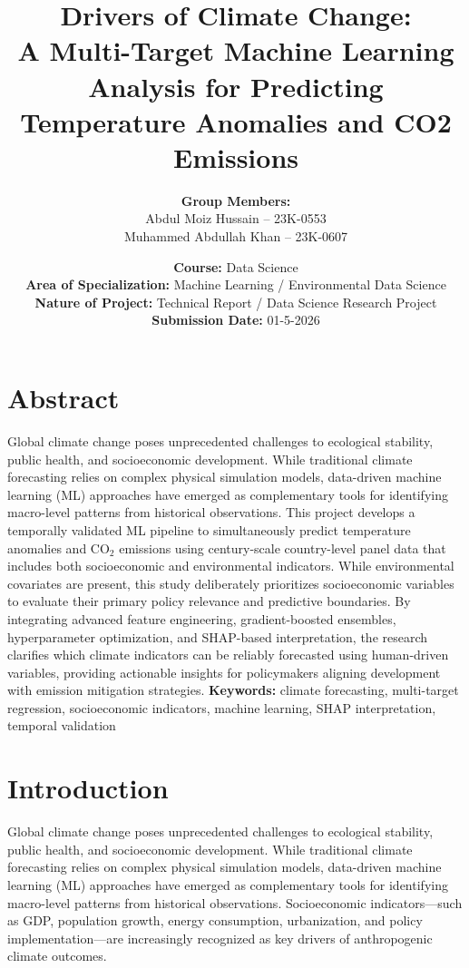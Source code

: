 \documentclass[12pt, a4paper]{article}
\title{
    \vspace{-2cm}
    \textbf{\Socioeconomic Drivers of Climate Change: \\ A Multi-Target Machine Learning Analysis for Predicting Temperature Anomalies and CO2 Emissions }
    \vspace{0.5cm}
}
\author{
    \textbf{Group Members:}\\[0.3cm]
    Abdul Moiz Hussain -- 23K-0553\\
    Muhammed Abdullah Khan -- 23K-0607
}
\date{
    \textbf{Course:} Data Science\\
    \textbf{Area of Specialization:} Machine Learning / Environmental Data Science\\
    \textbf{Nature of Project:} Technical Report / Data Science Research Project\\
    \textbf{Submission Date:} 01-5-2026
}
\begin{document}
\maketitle
\thispagestyle{empty}
\newpage
\tableofcontents

\section*{Abstract}
Global climate change poses unprecedented challenges to ecological stability, public health, and socioeconomic development. While traditional climate forecasting relies on complex physical simulation models, data-driven machine learning (ML) approaches have emerged as complementary tools for identifying macro-level patterns from historical observations. 
This project develops a temporally validated ML pipeline to simultaneously predict temperature anomalies and CO$_2$ emissions using century-scale country-level panel data that includes both socioeconomic and environmental indicators. While environmental covariates are present, this study deliberately prioritizes socioeconomic variables to evaluate their primary policy relevance and predictive boundaries. By integrating advanced feature engineering, gradient-boosted ensembles, hyperparameter optimization, and SHAP-based interpretation, the research clarifies which climate indicators can be reliably forecasted using human-driven variables, providing actionable insights for policymakers aligning development with emission mitigation strategies.
\vspace{0.5cm}
\noindent\textbf{Keywords:} climate forecasting, multi-target regression, socioeconomic indicators, machine learning, SHAP interpretation, temporal validation

\newpage

\newpage

\section{Introduction}
Global climate change poses unprecedented challenges to ecological stability, public health, and socioeconomic development. While traditional climate forecasting relies on complex physical simulation models, data-driven machine learning (ML) approaches have emerged as complementary tools for identifying macro-level patterns from historical observations. Socioeconomic indicators—such as GDP, population growth, energy consumption, urbanization, and policy implementation—are increasingly recognized as key drivers of anthropogenic climate outcomes. 
\end{document}

